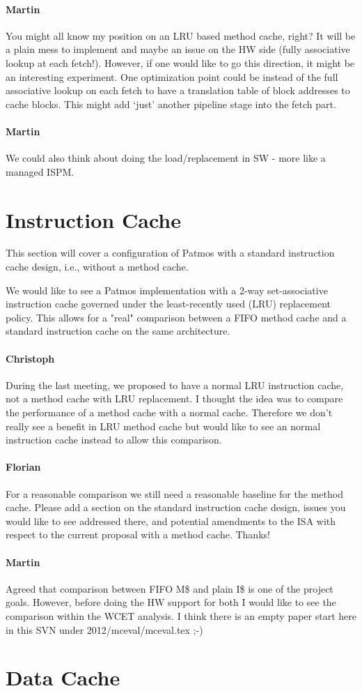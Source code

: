 \documentclass{IEEEtran}
\newcommand{\comment}[3]{\paragraph*{\textbf{#1}}{\color{#3}#2}}
\newcommand{\martin}[1]{\comment{Martin}{#1}{Blue}}
\newcommand{\cullmann}[1]{\comment{Christoph}{#1}{Maroon}}
\newcommand{\fb}[1]{\comment{Florian}{#1}{Emerald}}
\begin{document}
\martin{You might all know my position on an LRU based method cache, right?
It will be a plain mess to implement and maybe an issue on the HW
side (fully associative lookup at each fetch!). However, if one would
like to go this direction, it might be an interesting experiment.
One optimization point could be instead of the full associative lookup
on each fetch to have a translation table of block addresses to cache
blocks. This might add `just' another pipeline stage into the fetch
part.}

\martin{We could also think about doing the load/replacement
in SW - more like a managed ISPM.}
\section{Instruction Cache}

This section will cover a configuration of Patmos with a standard instruction cache design, i.e., without a method cache.

We would like to see a Patmos implementation with a 2-way set-associative instruction cache governed under the least-recently used (LRU) replacement policy.
This allows for a "real" comparison between a FIFO method cache and a standard instruction cache on the same architecture.

\cullmann{During the last meeting, we proposed to have a normal LRU instruction cache, not a method cache with LRU replacement.
I thought the idea was to compare the performance of a method cache with a normal cache.
Therefore we don't really see a benefit in LRU method cache but would like to see an normal instruction cache instead to allow this comparison.
}

\fb{For a reasonable comparison we still need a reasonable baseline for the
method cache. Please add a section on the standard instruction cache design,
issues you would like to see addressed there, and potential amendments to the
ISA with respect to the current proposal with a method cache. Thanks!}

\martin{Agreed that comparison between FIFO M\$ and plain I\$ is one of
the project goals. However, before doing the HW support for both I would
like to see the comparison within the WCET analysis. I think there is an
empty paper start here in this SVN under 2012/mceval/mceval.tex ;-)}

\section{Data Cache}
\end{document}
